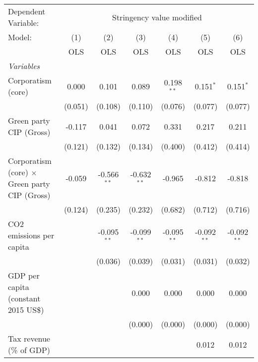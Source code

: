 
\begingroup
\centering
\begin{tabular}{lcccccc}
   \toprule
   Dependent Variable: & \multicolumn{6}{c}{Stringency value modified}\\
   Model:                                               & (1)     & (2)           & (3)           & (4)           & (5)           & (6)\\  
                                                        &  OLS    & OLS           & OLS           & OLS           & OLS           & OLS\\  
   \midrule
   \emph{Variables}\\
   Corporatism (core)                                   & 0.000   & 0.101         & 0.089         & 0.198$^{**}$  & 0.151$^{*}$   & 0.151$^{*}$\\   
                                                        & (0.051) & (0.108)       & (0.110)       & (0.076)       & (0.077)       & (0.077)\\   
   Green party CIP (Gross)                              & -0.117  & 0.041         & 0.072         & 0.331         & 0.217         & 0.211\\   
                                                        & (0.121) & (0.132)       & (0.134)       & (0.400)       & (0.412)       & (0.414)\\   
   Corporatism (core) $\times$ Green party CIP (Gross)  & -0.059  & -0.566$^{**}$ & -0.632$^{**}$ & -0.965        & -0.812        & -0.818\\   
                                                        & (0.124) & (0.235)       & (0.232)       & (0.682)       & (0.712)       & (0.716)\\   
   CO2 emissions per capita                             &         & -0.095$^{**}$ & -0.099$^{**}$ & -0.095$^{**}$ & -0.092$^{**}$ & -0.092$^{**}$\\   
                                                        &         & (0.036)       & (0.039)       & (0.031)       & (0.031)       & (0.032)\\   
   GDP per capita (constant 2015 US\$)                  &         &               & 0.000         & 0.000         & 0.000         & 0.000\\   
                                                        &         &               & (0.000)       & (0.000)       & (0.000)       & (0.000)\\   
   Tax revenue (\% of GDP)                              &         &               &               &               & 0.012         & 0.012\\   

\end{tabular}
